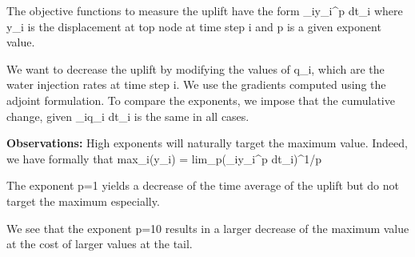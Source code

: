 The objective functions to measure the uplift have the form
          \Sigma_iy_i^p dt_i
where y_i is the displacement at top node at time step i and p is a given exponent value.

We want to decrease the uplift by modifying the values of q_i, which are the water injection rates at time step i. We use the gradients computed using the adjoint formulation. To compare the exponents, we impose that the cumulative change, given \Sigma_i\delta q_i dt_{i} is the same in all cases.  

{\bf Observations:} High exponents will naturally target the maximum value. Indeed, we have formally that
          max_i(y_i) = lim_{p\rightarrow\infty}(\Sigma_{i}y_{i}^{p} dt_i)^{1/p}

\bullet The exponent p=1 yields a decrease of the time average of the uplift but do not target the maximum especially. 

\bullet We see that the exponent p=10 results in a larger decrease of the maximum value at the cost of larger values at
the tail.


